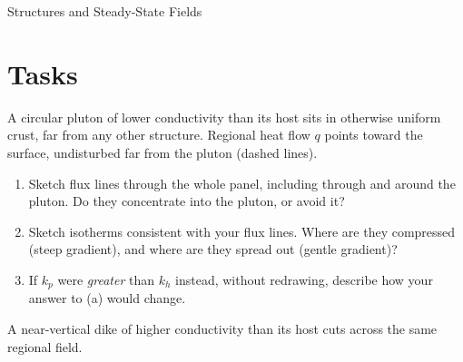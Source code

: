 \begin{activity}{Structures and Steady-State Fields}
\section*{Tasks}
\begin{questions}


A circular pluton of lower conductivity than its host sits in otherwise uniform crust, far from any other structure. Regional heat flow $q$ points toward the surface, undisturbed far from the pluton (dashed lines).

\begin{center}
\end{center}

\begin{enumerate}[label=(\alph*)]
  \item Sketch flux lines through the whole panel, including through and around the pluton. Do they concentrate into the pluton, or avoid it?
  \answerbox[2cm]

  \item Sketch isotherms consistent with your flux lines. Where are they compressed (steep gradient), and where are they spread out (gentle gradient)?
  \answerbox[2cm]

  \item If $k_p$ were \emph{greater} than $k_h$ instead, without redrawing, describe how your answer to (a) would change.
  \answerbox[2cm]
\end{enumerate}


A near-vertical dike of higher conductivity than its host cuts across the same regional field.

\begin{center}
\end{center}


\end{questions}
\end{activity}
